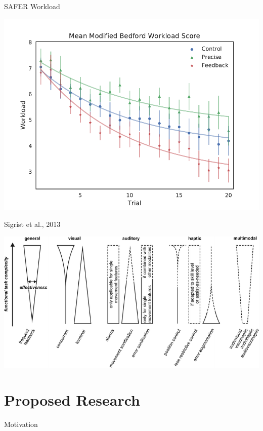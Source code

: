 \documentclass[10pt]{beamer}
\begin{document}
\begin{frame}[fragile]{SAFER Workload}
  \begin{center}
    \includegraphics[width=\textwidth]{../img/Group_Workload_fit_30.pdf}
  \end{center}
\end{frame}

\begin{frame}[fragile]{Sigrist et al., 2013~\cite{Sigrist2013}}
  \begin{center}
    \includegraphics[width=\textwidth]{../img/sigrist.png}
  \end{center}
\end{frame}

\section{Proposed Research}

\begin{frame}[fragile]{Motivation}
  \begin{itemize}
    
  \end{itemize}
\end{frame}
\end{document}
